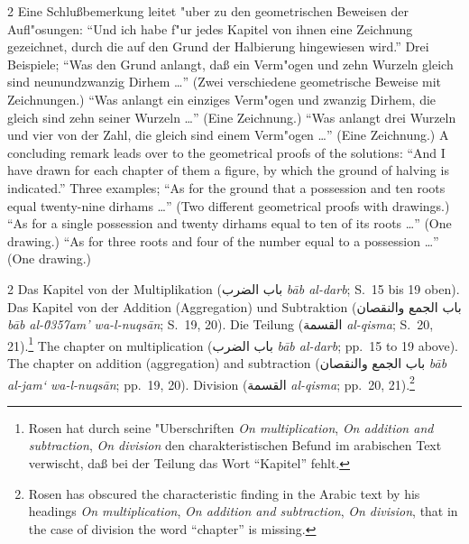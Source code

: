 \documentclass[10pt,a4paper]{article}
\renewcommand{\switchcolumn}{\syncronize\nointerlineskip\columnbreak}
\newcommand{\RL}[1]{\beginR#1\endR}
\newcommand{\ar}[1]{{\arabicfont\RL{#1}}}
\newcommand{\enquote}[1]{``#1''}
\begin{document}
\begin{paracol}{2}
Eine Schlu\ss{}bemerkung leitet "uber zu den geometrischen Beweisen der Aufl"osungen: \enquote{Und ich habe f"ur jedes Kapitel von ihnen eine Zeichnung gezeichnet, durch die auf den Grund der Halbierung hingewiesen wird.} Drei Beispiele; \enquote{Was den Grund anlangt, da\ss{} ein Verm"ogen und zehn Wurzeln gleich sind neunundzwanzig Dirhem \ldots{}} (Zwei verschiedene geometrische Beweise mit Zeichnungen.) \enquote{Was anlangt ein einziges Verm"ogen und zwanzig Dirhem, die gleich sind zehn seiner Wurzeln \ldots{}} (Eine Zeichnung.) \enquote{Was anlangt drei Wurzeln und vier von der Zahl, die gleich sind einem Verm"ogen \ldots{}} (Eine Zeichnung.)
\switchcolumn
A concluding remark leads over to the geometrical proofs of the solutions: ``And I have drawn for each chapter of them a figure, by which the ground of halving is indicated.'' Three examples; ``As for the ground that a possession and ten roots equal twenty-nine dirhams \ldots{}'' (Two different geometrical proofs with drawings.) ``As for a single possession and twenty dirhams equal to ten of its roots \ldots{}'' (One drawing.) ``As for three roots and four of the number equal to a possession \ldots{}'' (One drawing.)
\end{paracol}

\begin{paracol}{2}
Das Kapitel von der Multiplikation (\ar{باب الضرب} \textit{b\=ab al-darb}; S.\ 15 bis 19 oben). Das Kapitel von der Addition (Aggregation) und Subtraktion (\ar{باب الجمع والنقصان} \textit{b\=ab al-\u0357{}am' wa-l-nuqs\=an}; S.\ 19, 20). Die Teilung (\ar{القسمة} \textit{al-qisma}; S.\ 20, 21).\footnote{Rosen hat durch seine "Uberschriften \textit{On multiplication}, \textit{On addition and subtraction}, \textit{On division} den charakteristischen Befund im arabischen Text verwischt, da\ss{} bei der Teilung das Wort \enquote{Kapitel} fehlt.}
\switchcolumn
The chapter on multiplication (\ar{باب الضرب} \textit{b\=ab al-darb}; pp.\ 15 to 19 above). The chapter on addition (aggregation) and subtraction (\ar{باب الجمع والنقصان} \textit{b\=ab al-jam` wa-l-nuqs\=an}; pp.\ 19, 20). Division (\ar{القسمة} \textit{al-qisma}; pp.\ 20, 21).\footnote{Rosen has obscured the characteristic finding in the Arabic text by his headings \textit{On multiplication}, \textit{On addition and subtraction}, \textit{On division}, that in the case of division the word ``chapter'' is missing.}
\end{paracol}
\end{document}
